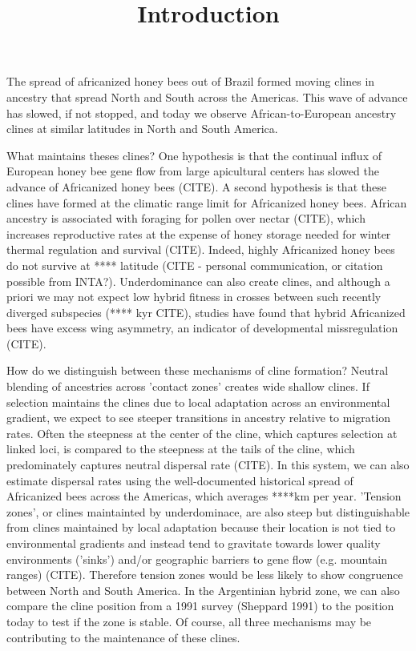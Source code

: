 \documentclass[12pt]{article}
\begin{document}
	\title{Introduction}
	\date{}
	\maketitle

\begin{paragraph}
The spread of africanized honey bees out of Brazil formed moving clines in ancestry that spread North and South across the Americas. This wave of advance has slowed, if not stopped, and today we observe African-to-European ancestry clines at similar latitudes in North and South America. 
\end{paragraph}
\begin{paragraph}
What maintains theses clines? One hypothesis is that the continual influx of European honey bee gene flow from large apicultural centers has slowed the advance of Africanized honey bees (CITE). A second hypothesis is that these clines have formed at the climatic range limit for Africanized honey bees. African ancestry is associated with foraging for pollen over nectar (CITE), which increases reproductive rates at the expense of honey storage needed for winter thermal regulation and survival (CITE). Indeed, highly Africanized honey bees do not survive at **** latitude (CITE - personal communication, or citation possible from INTA?). Underdominance can also create clines, and although a priori we may not expect low hybrid fitness in crosses between such recently diverged subspecies (**** kyr CITE), studies have found that hybrid Africanized bees have excess wing asymmetry, an indicator of developmental missregulation (CITE). 
\end{paragraph}
\begin{paragraph}
How do we distinguish between these mechanisms of cline formation? Neutral blending of ancestries across 'contact zones' creates wide shallow clines. If selection maintains the clines due to local adaptation across an environmental gradient, we expect to see steeper transitions in ancestry relative to migration rates. Often the steepness at the center of the cline, which captures selection at linked loci, is compared to the steepness at the tails of the cline, which predominately captures neutral dispersal rate (CITE). In this system, we can also estimate dispersal rates using the well-documented historical spread of Africanized bees across the Americas, which averages ****km per year. 'Tension zones', or clines maintainted by underdominace, are also steep but distinguishable from clines maintained by local adaptation because their location is not tied to environmental gradients and instead tend to gravitate towards lower quality environments ('sinks') and/or geographic barriers to gene flow (e.g. mountain ranges) (CITE). Therefore tension zones would be less likely to show congruence between North and South America. In the Argentinian hybrid zone, we can also compare the cline position from a 1991 survey (Sheppard 1991) to the position today to test if the zone is stable. Of course, all three mechanisms may be contributing to the maintenance of these clines.

\end{paragraph}

	
	
\end{document}
